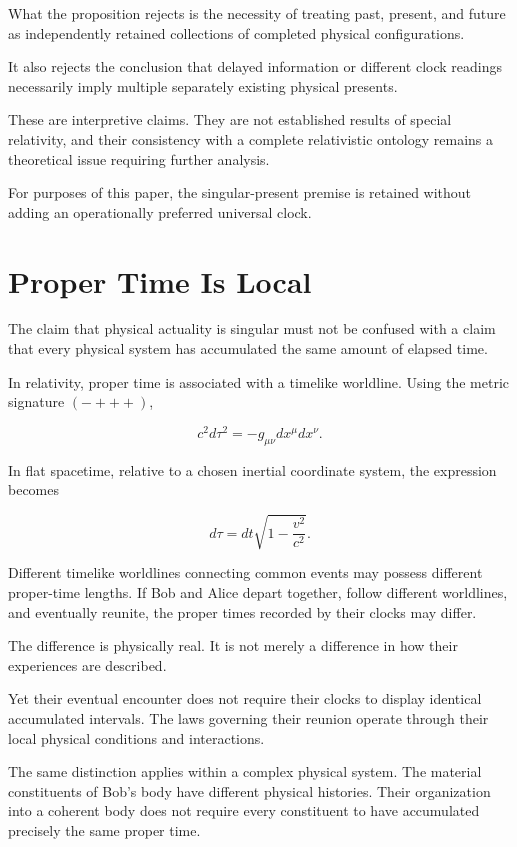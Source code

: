\documentclass[12pt,onecolumn]{article}
\begin{document}
What the proposition rejects is the necessity of treating past, present, and future as independently retained collections of completed physical configurations.

It also rejects the conclusion that delayed information or different clock readings necessarily imply multiple separately existing physical presents.

These are interpretive claims. They are not established results of special relativity, and their consistency with a complete relativistic ontology remains a theoretical issue requiring further analysis.

For purposes of this paper, the singular-present premise is retained without adding an operationally preferred universal clock.

\section{Proper Time Is Local}

The claim that physical actuality is singular must not be confused with a claim that every physical system has accumulated the same amount of elapsed time.

In relativity, proper time is associated with a timelike worldline. Using the metric signature $(-+++)$,

\begin{equation}
c^2d\tau^2=-g_{\mu\nu}dx^\mu dx^\nu.
\end{equation}

In flat spacetime, relative to a chosen inertial coordinate system, the expression becomes

\begin{equation}
d\tau=dt\sqrt{1-\frac{v^2}{c^2}}.
\end{equation}

Different timelike worldlines connecting common events may possess different proper-time lengths. If Bob and Alice depart together, follow different worldlines, and eventually reunite, the proper times recorded by their clocks may differ.

The difference is physically real. It is not merely a difference in how their experiences are described.

Yet their eventual encounter does not require their clocks to display identical accumulated intervals. The laws governing their reunion operate through their local physical conditions and interactions.

The same distinction applies within a complex physical system. The material constituents of Bob's body have different physical histories. Their organization into a coherent body does not require every constituent to have accumulated precisely the same proper time.
\end{document}
